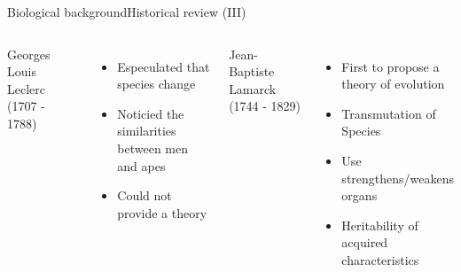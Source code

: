\documentclass[10pt,compress]{beamer} %
\begin{document}
\begin{frame}{Biological background}{Historical review (III)}
 	\begin{columns}
		Georges Louis Leclerc (1707 - 1788)

 	 	\begin{itemize}
		\item Especulated that species change
		\item Noticied the similarities between men and apes
		\item Could not provide a theory
		\end{itemize}

		Jean-Baptiste Lamarck (1744 - 1829)
		\begin{itemize}
		\item First to propose a theory of evolution
		\item Transmutation of Species
		\item Use strengthens/weakens organs
		\item Heritability of acquired characteristics
		\end{itemize}


\end{columns}
\end{frame}
\end{document}
